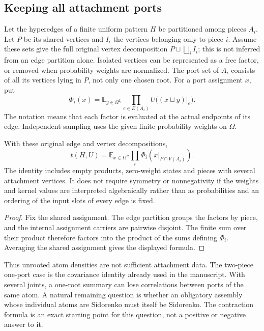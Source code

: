 \subsection{Keeping all attachment ports}

Let the hyperedges of a finite uniform pattern $H$ be partitioned among pieces
$A_i$.  Let $P$ be its shared vertices and $I_i$ the vertices belonging
only to piece $i$.  Assume these sets give the full original vertex
decomposition $P\sqcup\bigsqcup_i I_i$; this is not inferred from an
edge partition alone.  Isolated vertices can be represented as a
free factor, or removed when probability weights are normalized.
The port set of $A_i$ consists of all its
vertices lying in $P$, not only one chosen root.  For a port assignment
$x$, put
\[
 \Phi_i(x)=\mathbb E_{y\in\Omega^{I_i}}
                 \prod_{e\in E(A_i)}U\bigl((x\sqcup y)|_e\bigr).
\]
The notation means that each factor is evaluated at the actual
endpoints of its edge.  Independent sampling uses the given finite
probability weights on $\Omega$.

\begin{proposition}
\label{density-multiport-contraction}
With these original edge and vertex decompositions,
\[
 t(H,U)=\mathbb E_{x\in\Omega^P}\prod_i\Phi_i(x|_{P\cap V(A_i)}).
\]
The identity includes empty products, zero-weight states and pieces
with several attachment vertices.  It does not require symmetry or
nonnegativity if the weights and kernel values are interpreted
algebraically rather than as probabilities and an ordering of the
input slots of every edge is fixed.
\end{proposition}
\begin{proof}
Fix the shared assignment.  The edge partition groups the factors
by piece, and the internal assignment carriers are pairwise disjoint.
The finite sum over their product therefore factors into the product
of the sums defining $\Phi_i$.  Averaging the shared assignment gives
the displayed formula.
\end{proof}

Thus unrooted atom densities are not sufficient attachment data.
The two-piece one-port case is the covariance identity already used
in the manuscript.  With several joints, a one-root summary can lose
correlations between ports of the same atom.  A natural remaining
question is whether an obligatory assembly whose individual atoms
are Sidorenko must itself be Sidorenko.  The contraction formula is
an exact starting point for this question, not a positive or negative
answer to it.

